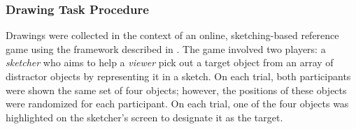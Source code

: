\documentclass[10pt,letterpaper]{article}
\begin{document}





\subsubsection{Drawing Task Procedure}
Drawings were collected in the context of an online, sketching-based reference game using the framework described in . The game involved two players: a \textit{sketcher} who aims to help a \textit{viewer} pick out a target object from an array of distractor objects by representing it in a sketch. On each trial, both participants were shown the same set of four objects; however, the positions of these objects were randomized for each participant. On each trial, one of the four objects was highlighted on the sketcher's screen to designate it as the target.
\end{document}
